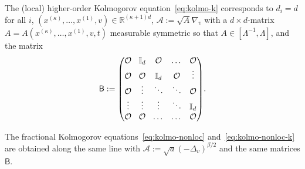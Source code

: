 \documentclass[10pt,a4paper]{amsart}
\theoremstyle{definition}
\newcommand\R{{\mathbb R}}
\newcommand{\cA}{{\mathcal A}}
\newcommand{\sB}{{\mathsf B}}
\begin{document}
The (local) higher-order Kolmogorov equation~\eqref{eq:kolmo-k}
corresponds to $d_i=d$ for all $i$,
$(x^{(\kappa)},\dots,x^{(1)},v) \in \R^{(\kappa+1)d}$,
$\cA:=\sqrt{A} \nabla_{v} $ with a $d \times d$-matrix
$A=A(x^{(\kappa)},\dots,x^{(1)},v,t)$ measurable symmetric
so that $A \in [\Lambda^{-1},\Lambda]$, and the matrix
\begin{equation*}\arraycolsep4.5pt
\sB := \begin{pmatrix}
\OO & \mathbb{I}_d & \OO & \ldots & \OO \\
\OO & \OO & \mathbb{I}_d & \OO& \vdots \\
\OO & \vdots & \ddots & \ddots & \OO \\
\vdots & \vdots & \vdots & \ddots & \mathbb{I}_d \\
\OO & \OO & \ldots & \ldots & \OO
\end{pmatrix}\!.
\end{equation*}

The fractional Kolmogorov equations~\eqref{eq:kolmo-nonloc}
and~\eqref{eq:kolmo-nonloc-k} are obtained along the same line
with $\cA:= \sqrt{a} (-\Delta_v)^{\beta/2}$ and the same
matrices $\sB$.
\end{document}
